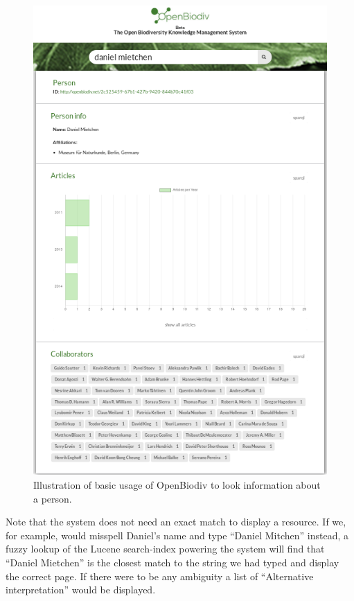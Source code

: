 \begin{figure}
\centering
\includegraphics[width=\textwidth]{Figures/basic-level.png}
\decoRule
\caption{Illustration of basic usage of OpenBiodiv to look information about a person.}
\label{fig:basic-level}
\end{figure}

Note that the system does not need an exact match to display a resource. If we, for example, would misspell Daniel's name and type ``Daniel Mitchen'' instead, a fuzzy lookup of the Lucene search-index powering the system will find that ``Daniel Mietchen'' is the closest match to the string we had typed and display the correct page. If there were to be any ambiguity a list of ``Alternative interpretation'' would be displayed.

